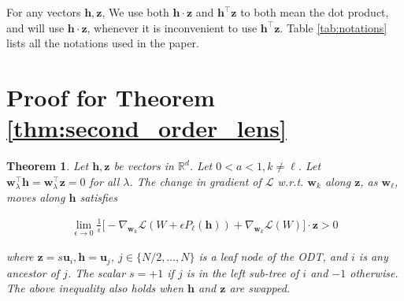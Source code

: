 \documentclass{article}
\theoremstyle{plain}
\newtheorem*{theorem*}{Theorem}
\theoremstyle{definition}
\theoremstyle{remark}
\newcommand{\R}{{\mathbb R}}
\newcommand{\1}{{\mathbf 1}}
\newcommand{\0}{{\mathbf 0}}
\newcommand{\h}{{\mathbf h}}
\newcommand{\z}{{\mathbf z}}
\newcommand{\w}{{\mathbf w}}
\newcommand{\bu}{{\mathbf u}}
\renewcommand{\>}{{\rightarrow}}
\begin{document}
For any vectors $\h,\z$, We use both $\h \cdot \z$ and $\h^\top \z$ to both mean the dot product, and will use $\h \cdot \z$, whenever it is inconvenient to use $\h^\top \z$. Table \ref{tab:notations} lists all the notations used in the paper.


\section{Proof for Theorem \ref{thm:second_order_lens}}
\begin{theorem*}
Let $\h, \z$ be vectors in $\R^d$. Let $0<a<1, k\neq \ell$. Let $\w_\lambda^\top \h = \w_\lambda^\top \z = 0$ for all $\lambda$. The change in gradient of $\mathcal{L}$ w.r.t. $\w_k$ along $\z$,   as $\w_\ell$, moves along $\h$ satisfies

\begin{align*}
\lim_{\epsilon \to 0} \frac{1}{\epsilon} \bigg[ 
 -\nabla_{\w_k} \mathcal{L}(W + \epsilon P_\ell(\h))  
 + \nabla_{\w_k} \mathcal{L}(W)  \bigg]\cdot \z > 0
\end{align*}

where $\z= s \bu_i, \h = \bu_j$,  $j\in\{N/2,\ldots,N\}$ is a leaf node of the ODT, and $i$ is any ancestor of $j$. The scalar $s=+1$ if $j$ is in the left sub-tree of $i$ and $-1$ otherwise. The above inequality also holds when $\h$ and $\z$ are swapped.
\end{theorem*}
\end{document}
